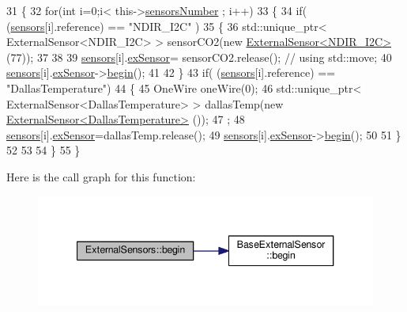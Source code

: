 \begin{DoxyCode}
31 \{
32     \textcolor{keywordflow}{for}(\textcolor{keywordtype}{int} i=0;i< this->\hyperlink{classExternalSensors_a58e4fbf9adeae787d92be5fa33043b5d}{sensorsNumber} ; i++)
33     \{
34         \textcolor{keywordflow}{if}( (\hyperlink{classExternalSensors_a284233f884fcf00154a44740cf1d9e1e}{sensors}[i].reference) == \textcolor{stringliteral}{"NDIR\_I2C"} )
35         \{   
36             std::unique\_ptr< ExternalSensor<NDIR\_I2C> > sensorCO2(\textcolor{keyword}{new} 
      \hyperlink{classExternalSensor_3_01NDIR__I2C_01_4}{ExternalSensor<NDIR\_I2C>} (77));
37 
38 
39             \hyperlink{classExternalSensors_a284233f884fcf00154a44740cf1d9e1e}{sensors}[i].\hyperlink{structExternalSensors_1_1sensor_a9bca150fd468b8d0e090e6d72c5c2b48}{exSensor}= sensorCO2.release();                       \textcolor{comment}{// using
       std::move;}
40             \hyperlink{classExternalSensors_a284233f884fcf00154a44740cf1d9e1e}{sensors}[i].\hyperlink{structExternalSensors_1_1sensor_a9bca150fd468b8d0e090e6d72c5c2b48}{exSensor}->\hyperlink{classBaseExternalSensor_a87d132803d4f4fdd4e66332809f0c9a0}{begin}();
41 
42         \}
43         \textcolor{keywordflow}{if}( (\hyperlink{classExternalSensors_a284233f884fcf00154a44740cf1d9e1e}{sensors}[i].reference) == \textcolor{stringliteral}{"DallasTemperature"})
44         \{
45             OneWire oneWire(0);
46             std::unique\_ptr< ExternalSensor<DallasTemperature> > dallasTemp(\textcolor{keyword}{new} 
      \hyperlink{classExternalSensor_3_01DallasTemperature_01_4}{ExternalSensor<DallasTemperature>} ());
47              ;
48             \hyperlink{classExternalSensors_a284233f884fcf00154a44740cf1d9e1e}{sensors}[i].\hyperlink{structExternalSensors_1_1sensor_a9bca150fd468b8d0e090e6d72c5c2b48}{exSensor}=dallasTemp.release();
49             \hyperlink{classExternalSensors_a284233f884fcf00154a44740cf1d9e1e}{sensors}[i].\hyperlink{structExternalSensors_1_1sensor_a9bca150fd468b8d0e090e6d72c5c2b48}{exSensor}->\hyperlink{classBaseExternalSensor_a87d132803d4f4fdd4e66332809f0c9a0}{begin}();
50             
51         \}
52         
53         
54     \}
55 \}
\end{DoxyCode}
Here is the call graph for this function\+:\nopagebreak
\begin{figure}[H]
\begin{center}
\leavevmode
\includegraphics[width=340pt]{classExternalSensors_a58ede0d786a86417254708870f04a21e_cgraph}
\end{center}
\end{figure}
